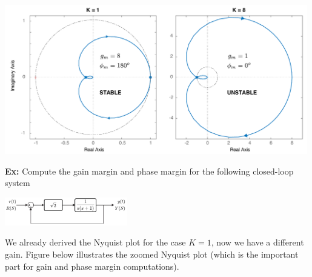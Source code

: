 \documentclass[twoside]{article}
\begin{document}
\begin{center}
\begin{minipage}[h]{\linewidth}
    \begin{center}
      \includegraphics[width=0.99\textwidth]{ex3}
    \end{center}
\end{minipage}
\end{center}

\newpage

\textbf{Ex:} Compute the gain margin and phase margin 
for the following closed-loop system 

\begin{center}
\begin{minipage}[h]{\linewidth}
    \begin{center}
      \includegraphics[width=0.4\textwidth]{ex4block}
    \end{center}
\end{minipage}
\end{center}

We already derived the Nyquist plot for the case $K = 1$,
now we have a different gain. Figure below illustrates 
the zoomed Nyquist plot (which is the important part
for gain and phase margin computations).

\vspace{6pt}
\end{document}
